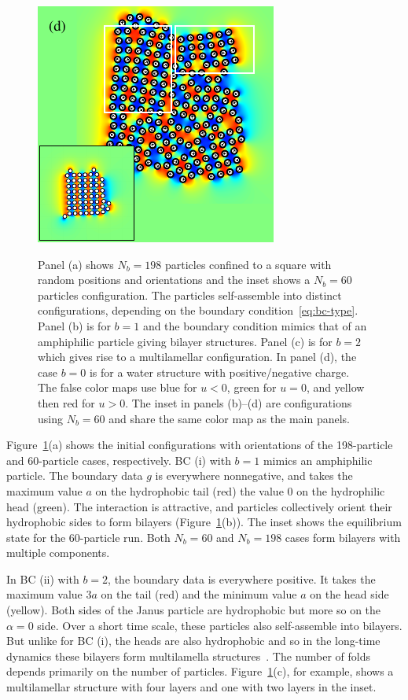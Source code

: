 \documentclass[prb,preprint,showpacs,preprintnumbers,amsmath,amssymb,longbibliography]{revtex4-1}
\begin{document}
\begin{figure}[h!]
\begin{center}
  \includegraphics[height=0.3\textheight]{Nb198d_eta_inset.pdf}
\end{center}
\begin{caption}{\label{fig:relax}
  Panel (a) shows $N_b = 198$ particles confined to a square with random
  positions and orientations and the inset shows a $N_b=60$ particles
  configuration. The particles self-assemble into distinct
  configurations, depending on the boundary
  condition~\eqref{eq:bc-type}. Panel (b) is for $b=1$ and the boundary
  condition mimics that of an amphiphilic particle giving bilayer
  structures. Panel (c) is for $b=2$ which gives rise to a
  multilamellar configuration. In panel (d), the case $b = 0$ is for a
  water structure with positive/negative charge. The false color maps
  use blue for $u < 0$, green for $u = 0$, and yellow then red for $u >
  0$. The inset in panels (b)--(d) are configurations using $N_b=60$ and
  share the same color map as the main panels.}
\end{caption}
\end{figure}


Figure~\ref{fig:relax}(a) shows the initial configurations with
orientations of the 198-particle and 60-particle cases, respectively.
BC (i) with $b = 1$ mimics an amphiphilic particle. The boundary data
$g$ is everywhere nonnegative, and takes the maximum value $a$ on the
hydrophobic tail (red) the value $0$ on the hydrophilic head (green).
The interaction is attractive, and particles collectively orient their
hydrophobic sides to form bilayers (Figure~\ref{fig:relax}(b)). The
inset shows the equilibrium state for the 60-particle run. Both
$N_b = 60$ and $N_b = 198$ cases
form bilayers with multiple components.

In BC (ii) with $b = 2$, the boundary data is everywhere positive. It
takes the maximum value $3a$ on the tail (red) and the minimum value $a$
on the head side (yellow). Both sides of the Janus particle are
hydrophobic but more so on the $\alpha = 0$ side. Over a short time
scale, these particles also self-assemble into bilayers. But unlike for
BC (i), the heads are also hydrophobic and so in the long-time dynamics
these bilayers form multilamella structures~\cite{C9NR05885K}. The
number of folds depends primarily on the number of particles.
Figure~\ref{fig:relax}(c), for example, shows a multilamellar structure
with four layers and one with two layers in the inset.
\end{document}
